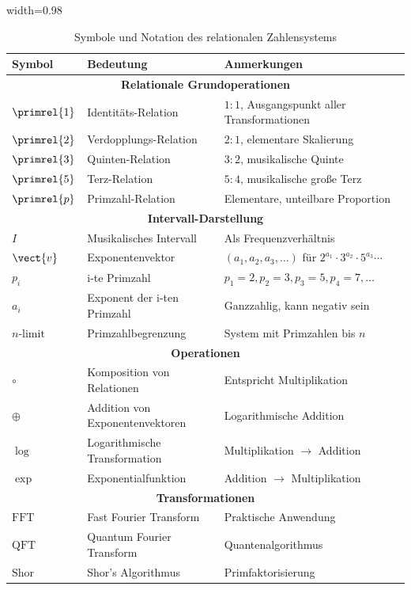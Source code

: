 	{\small
		\begin{table}[htbp]
			\centering
			\begin{adjustbox}{width=0.98\textwidth}
				\begin{tabular}{lll}
					\toprule
					\textbf{Symbol} & \textbf{Bedeutung} & \textbf{Anmerkungen} \\
					\midrule
					\multicolumn{3}{c}{\textbf{Relationale Grundoperationen}} \\
					$\primrel{1}$ & Identitäts-Relation & $1:1$, Ausgangspunkt aller Transformationen \\
					$\primrel{2}$ & Verdopplungs-Relation & $2:1$, elementare Skalierung \\
					$\primrel{3}$ & Quinten-Relation & $3:2$, musikalische Quinte \\
					$\primrel{5}$ & Terz-Relation & $5:4$, musikalische große Terz \\
					$\primrel{p}$ & Primzahl-Relation & Elementare, unteilbare Proportion \\
					\midrule
					\multicolumn{3}{c}{\textbf{Intervall-Darstellung}} \\
					$I$ & Musikalisches Intervall & Als Frequenzverhältnis \\
					$\vect{v}$ & Exponentenvektor & $(a_1, a_2, a_3, \ldots)$ für $2^{a_1} \cdot 3^{a_2} \cdot 5^{a_3} \cdots$ \\
					$p_i$ & i-te Primzahl & $p_1=2, p_2=3, p_3=5, p_4=7, \ldots$ \\
					$a_i$ & Exponent der i-ten Primzahl & Ganzzahlig, kann negativ sein \\
					$n\text{-limit}$ & Primzahlbegrenzung & System mit Primzahlen bis $n$ \\
					\midrule
					\multicolumn{3}{c}{\textbf{Operationen}} \\
					$\circ$ & Komposition von Relationen & Entspricht Multiplikation \\
					$\oplus$ & Addition von Exponentenvektoren & Logarithmische Addition \\
					$\log$ & Logarithmische Transformation & Multiplikation $\to$ Addition \\
					$\exp$ & Exponentialfunktion & Addition $\to$ Multiplikation \\
					\midrule
					\multicolumn{3}{c}{\textbf{Transformationen}} \\
					$\text{FFT}$ & Fast Fourier Transform & Praktische Anwendung \\
					$\text{QFT}$ & Quantum Fourier Transform & Quantenalgorithmus \\
					$\text{Shor}$ & Shor's Algorithmus & Primfaktorisierung \\
					\bottomrule
				\end{tabular}
			\end{adjustbox}
			\caption{Symbole und Notation des relationalen Zahlensystems}
			\label{tab:symbole}
		\end{table}
	}

